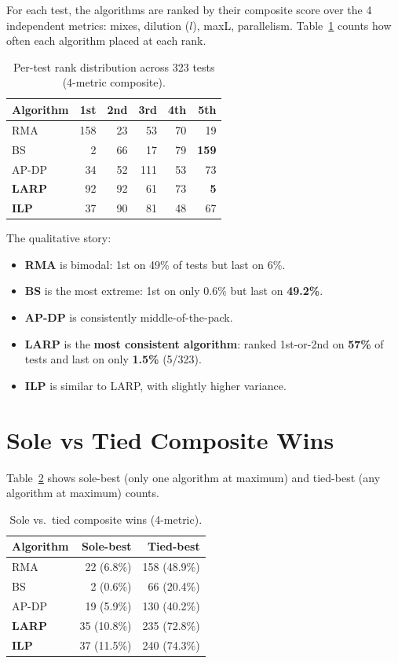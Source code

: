 For each test, the algorithms are ranked by their composite score over the 4 independent metrics: mixes, dilution ($l$), maxL, parallelism. Table~\ref{tab:rank_dist} counts how often each algorithm placed at each rank.

\begin{table}[H]
\centering
\caption{Per-test rank distribution across 323 tests (4-metric composite).}
\label{tab:rank_dist}
\begin{tabular}{|l|r|r|r|r|r|}
\hline
\textbf{Algorithm} & \textbf{1st} & \textbf{2nd} & \textbf{3rd} & \textbf{4th} & \textbf{5th} \\
\hline
RMA & 158 & 23 & 53 & 70 & 19 \\
\hline
BS & 2 & 66 & 17 & 79 & \textbf{159} \\
\hline
AP-DP & 34 & 52 & 111 & 53 & 73 \\
\hline
\textbf{LARP} & 92 & 92 & 61 & 73 & \textbf{5} \\
\hline
\textbf{ILP} & 37 & 90 & 81 & 48 & 67 \\
\hline
\end{tabular}
\end{table}

The qualitative story:
\begin{itemize}
    \item \textbf{RMA} is bimodal: 1st on 49\% of tests but last on 6\%.
    \item \textbf{BS} is the most extreme: 1st on only 0.6\% but last on \textbf{49.2\%}.
    \item \textbf{AP-DP} is consistently middle-of-the-pack.
    \item \textbf{LARP} is the \textbf{most consistent algorithm}: ranked 1st-or-2nd on \textbf{57\%} of tests and last on only \textbf{1.5\%} (5/323).
    \item \textbf{ILP} is similar to LARP, with slightly higher variance.
\end{itemize}

\section{Sole vs Tied Composite Wins}

Table~\ref{tab:sole_tied} shows sole-best (only one algorithm at maximum) and tied-best (any algorithm at maximum) counts.

\begin{table}[H]
\centering
\caption{Sole vs.\ tied composite wins (4-metric).}
\label{tab:sole_tied}
\begin{tabular}{|l|r|r|}
\hline
\textbf{Algorithm} & \textbf{Sole-best} & \textbf{Tied-best} \\
\hline
RMA & 22 (6.8\%) & 158 (48.9\%) \\
\hline
BS & 2 (0.6\%) & 66 (20.4\%) \\
\hline
AP-DP & 19 (5.9\%) & 130 (40.2\%) \\
\hline
\textbf{LARP} & 35 (10.8\%) & 235 (72.8\%) \\
\hline
\textbf{ILP} & 37 (11.5\%) & 240 (74.3\%) \\
\hline
\end{tabular}
\end{table}

